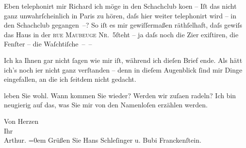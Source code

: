 \pstart
           Eben telephonirt mir Richard ich möge in den
                  Schachclub ko{\geminationm}en
               – Iſt das nicht ganz unwahrſcheinlich in Paris zu
               hören, daſs hier weiter telephonirt wird – in den Schachclub gegangen –? So iſt es mir gewiſſermaßen räthſelhaft, daſs gewiſs
               das Haus {\pb}in der \textsc{rue Maubeuge Nr. 5}ſteht – ja daſs noch die Zi{\geminationm}er exiſtiren, die Fenſter – die Waſchtiſche – –\pend
           
\pstart
           Ich ka{\geminationn} Ihnen gar nicht ſagen wie mir iſt, während ich
               dieſen Brief ende. Als hätt ich’s noch i{\geminationm}er nicht ganz
                  verſtanden – denn in
               dieſem Augenblick ſind mir Dinge eingefallen, an die ich ſeitdem nicht gedacht.\pend
           
\pstart
           {\pb}leben Sie wohl. Wann kommen Sie wieder? Werden wir
                  zuſa{\geminationm}en radeln? Ich bin neugierig auf das, was Sie
               mir von den Namenloſen erzählen werden.\pend
           
\pstart
           Von Herzen{\\[\baselineskip]}Ihr{\\[\baselineskip]}\spacefill\mbox{Arthur.}\pend
           \leftskip=0em{}
\pstart
           Grüßen Sie Hans Schleſinger u. Bubi Franckenſtein.\pend
           \endnumbering{}  
      